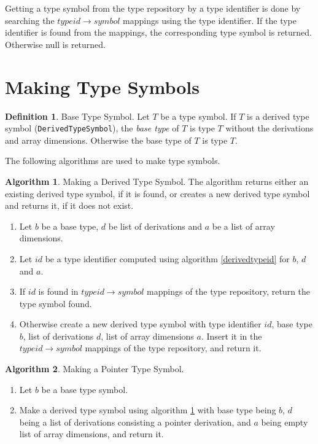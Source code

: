\documentclass[a4paper,oneside,11pt]{book}
\theoremstyle{definition}
\newtheorem{algo}{Algorithm}[section]
\newtheorem{defn}{Definition}[section]
\begin{document}
Getting a type symbol from the type repository by a type identifier is done by searching the $typeid \rightarrow symbol$ mappings using the type identifier.
If the type identifier is found from the mappings, the corresponding type symbol is returned. Otherwise null is returned.

\section{Making Type Symbols}

\begin{defn} Base Type Symbol.
Let $T$ be a type symbol.
If $T$ is a derived type symbol (\verb|DerivedTypeSymbol|), the \emph{base type} of $T$ is type $T$ without the derivations and array dimensions.
Otherwise the base type of $T$ is type $T$.
\end{defn}

The following algorithms are used to make type symbols.

\begin{algo}\label{makederivedtype} Making a Derived Type Symbol.
The algorithm returns either an existing derived type symbol, if it is found,
or creates a new derived type symbol and returns it, if it does not exist.
\begin{enumerate}
\item
Let $b$ be a base type, $d$ be list of derivations and $a$ be a list of array dimensions.
\item
Let $id$ be a type identifier computed using algorithm \ref{derivedtypeid} for $b$, $d$ and $a$.
\item
If $id$ is found in $type id \rightarrow symbol$ mappings of the type repository, return the type symbol found.
\item
Otherwise create a new derived type symbol with type identifier $id$, base type $b$, list of derivations $d$, list of array dimensions $a$.
Insert it in the $type id \rightarrow symbol$ mappings of the type repository, and return it.
\end{enumerate}
\end{algo}

\begin{algo}\label{makepointertype} Making a Pointer Type Symbol.
\begin{enumerate}
\item
Let $b$ be a base type symbol.
\item
Make a derived type symbol using algorithm \ref{makederivedtype} with base type being $b$,
$d$ being a list of derivations consisting a pointer derivation,
and $a$ being empty list of array dimensions, and return it.
\end{enumerate}
\end{algo}
\end{document}
